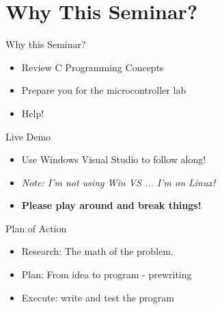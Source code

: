 \documentclass[main.tex]{subfile}
\begin{document}
\section{Why This Seminar?} 
\label{sec:why_this_seminar_}
\begin{frame}{Why this Seminar?}
	\begin{itemize}
		\item Review C Programming Concepts
		\item Prepare you for the microcontroller lab
		\item Help!
	\end{itemize}
\end{frame}

\begin{frame}{Live Demo}
	\begin{itemize}
		\item Use Windows Visual Studio to follow along!
		\item \emph{Note: I'm not using Win VS ... I'm on Linux!}
		\item \textbf{Please play around and break things!}
	\end{itemize}
\end{frame}

\begin{frame}{Plan of Action}
	\begin{itemize}
		\item Research: The math of the problem.
		\item Plan: From idea to program - prewriting
		\item Execute: write and test the program
	\end{itemize}
\end{frame}
\end{document}
